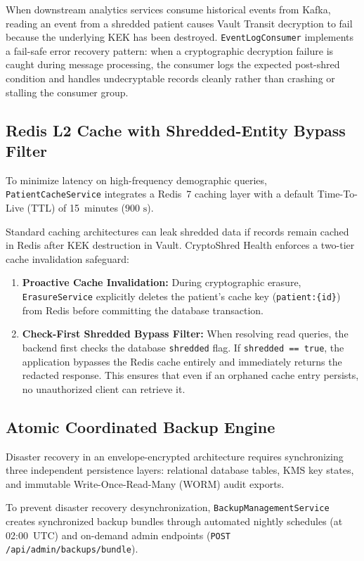 When downstream analytics services consume historical events from Kafka, reading an event from a shredded patient causes Vault Transit decryption to fail because the underlying KEK has been destroyed. \texttt{EventLogConsumer} implements a fail-safe error recovery pattern: when a cryptographic decryption failure is caught during message processing, the consumer logs the expected post-shred condition and handles undecryptable records cleanly rather than crashing or stalling the consumer group.

\subsection{Redis L2 Cache with Shredded-Entity Bypass Filter}

To minimize latency on high-frequency demographic queries, \texttt{PatientCacheService} integrates a Redis~7 caching layer with a default Time-To-Live (TTL) of 15~minutes ($900\text{~s}$).

Standard caching architectures can leak shredded data if records remain cached in Redis after KEK destruction in Vault. CryptoShred Health enforces a two-tier cache invalidation safeguard:
\begin{enumerate}
    \item \textbf{Proactive Cache Invalidation:} During cryptographic erasure, \texttt{ErasureService} explicitly deletes the patient's cache key (\texttt{patient:\{id\}}) from Redis before committing the database transaction.
    \item \textbf{Check-First Shredded Bypass Filter:} When resolving read queries, the backend first checks the database \texttt{shredded} flag. If \texttt{shredded == true}, the application bypasses the Redis cache entirely and immediately returns the redacted response. This ensures that even if an orphaned cache entry persists, no unauthorized client can retrieve it.
\end{enumerate}

\subsection{Atomic Coordinated Backup Engine}

Disaster recovery in an envelope-encrypted architecture requires synchronizing three independent persistence layers: relational database tables, KMS key states, and immutable Write-Once-Read-Many (WORM) audit exports.

To prevent disaster recovery desynchronization, \texttt{BackupManagementService} creates synchronized backup bundles through automated nightly schedules (at 02:00~UTC) and on-demand admin endpoints (\texttt{POST /api/admin/backups/bundle}). 

